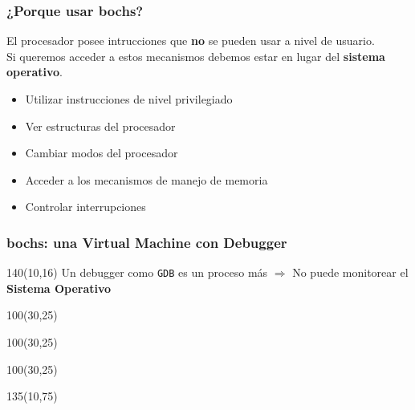 \documentclass[aspectratio=169]{beamer}
\begin{document}
\begin{frame}
    \frametitle{¿Porque usar bochs?}
    El procesador posee intrucciones que \textbf{no} se pueden usar a nivel de usuario. \\
    \vspace{0.3cm}
    \pause
    Si queremos acceder a estos mecanismos debemos estar en lugar del \textbf{sistema operativo}.
    \vspace{0.6cm}
    \begin{itemize}
    \item<3->[-] Utilizar instrucciones de nivel privilegiado
    \vspace{0.3cm}
    \item<4->[-] Ver estructuras del procesador
    \vspace{0.3cm}
    \item<5->[-] Cambiar modos del procesador
    \vspace{0.3cm}
    \item<6->[-] Acceder a los mecanismos de manejo de memoria
    \vspace{0.3cm}
    \item<7->[-] Controlar interrupciones
    \end{itemize}
\end{frame}

\begin{frame}[t]
    \frametitle{bochs: una Virtual Machine con Debugger}
    \begin{textblock}{140}(10,16)
    Un debugger como \texttt{GDB} es un \textcolor{naranjauca}{proceso} más
    \hspace{0.3cm} {\Large $\Rightarrow$} \hspace{0.3cm}
    No puede monitorear el \textbf{Sistema Operativo}
    \end{textblock}    
    \begin{textblock}{100}(30,25)
    \end{textblock}
    \begin{textblock}{100}(30,25)
    \end{textblock}
    \begin{textblock}{100}(30,25)
    \begin{center}
    \end{center}
    \end{textblock}
    \begin{textblock}{135}(10,75)
    \begin{center}
    \end{center}
    \end{textblock}
\end{frame}
\end{document}
